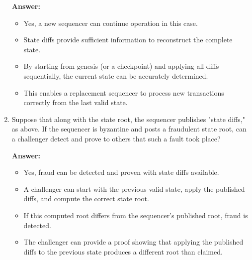 \documentclass{article}
\begin{document}
\begin{enumerate}
\textbf{Answer:}

\begin{itemize}
\item Yes, a new sequencer can continue operation in this case.
\item State diffs provide sufficient information to reconstruct the complete state.
\item By starting from genesis (or a checkpoint) and applying all diffs sequentially, the current state can be accurately determined.
\item This enables a replacement sequencer to process new transactions correctly from the last valid state.
\end{itemize}

\item Suppose that along with the state root, the sequencer publishes "state diffs," as above. If the sequencer is byzantine and posts a fraudulent state root, can a challenger detect and prove to others that such a fault took place?

\textbf{Answer:}

\begin{itemize}
\item Yes, fraud can be detected and proven with state diffs available.
\item A challenger can start with the previous valid state, apply the published diffs, and compute the correct state root.
\item If this computed root differs from the sequencer's published root, fraud is detected.
\item The challenger can provide a proof showing that applying the published diffs to the previous state produces a different root than claimed.
\end{itemize}

\end{enumerate}
\end{document}
